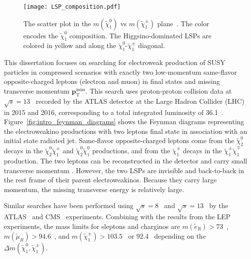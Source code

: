 \begin{figure}[htbp]
    \begin{center}
        \texttt{[image: LSP\_composition.pdf]}
        \caption{The scatter plot in the $m(\widetilde{\chi}^{0}_{1})$ vs $m(\widetilde{\chi}^{\pm}_{1})$ plane~\cite{Aaboud:2016wna}.
        The color encodes the $\widetilde{\chi}^{0}_{1}$ composition.
        The Higgsino-dominated LSPs are colored in yellow and along the $\widetilde{\chi}^{0}_{1}$-$\widetilde{\chi}^{\pm}_{1}$ diagonal.}
        \label{fig:intro_LSP_composition}
    \end{center}
\end{figure}

This dissertation focuses on searching for electroweak production of SUSY particles in compressed scenarios with exactly two low-momentum same-flavor opposite-charged leptons (electron and muon) in final states and missing transverse momentum $\textbf{p}_{\text{T}}^{\text{miss}}$.
This search uses proton-proton collision data at $\sqrt{s} = 13$~{\TeV} recorded by the ATLAS detector at the Large Hadron Collider (LHC)~\cite{Evans:2008zzb} in 2015 and 2016, corresponding to a total integrated luminosity of 36.1~\ifb.
Figure~\ref{fig:intro_feynman_diagrams} shows the Feynman diagrams representing the electroweakino productions with two leptons final state in association with an initial state radiated jet.
Same-flavor opposite-charged leptons come from the $\widetilde{\chi}^{0}_{2}$ decays in the $\widetilde{\chi}^{0}_{2} \widetilde{\chi}^{\pm}_{1}$ and $\widetilde{\chi}^{0}_{2} \widetilde{\chi}^{0}_{1}$ productions, and from the $\widetilde{\chi}^{\pm}_{1}$ decays in the $\widetilde{\chi}^{\pm}_{1} \widetilde{\chi}^{\mp}_{1}$ production.
The two leptons can be reconstructed in the detector and carry small transverse momentum  \pt.
However, the two LSPs are invisible and back-to-back in the rest frame of their parent electroweakinos.
Because they carry large momentum, the missing transverse energy \met is relatively large.

Similar searches have been performed using $\sqrt{s} = 8$~{\TeV} and $\sqrt{s} = 13$~{\TeV} by the ATLAS~\cite{Aad:2014vma, Aad:2014nua, Aad:2015eda, Aaboud:2016wna} and CMS~\cite{Khachatryan:2014qwa, Khachatryan:2015pot, Sirunyan:2017lae} experiments.
Combining with the results from the LEP experiments, the mass limits for sleptons and charginos are $m(\widetilde{e}_{R}) > 73$~{\GeV}, $m(\widetilde{\mu}_{R}) > 94.6$~{\GeV}, and $m(\widetilde{\chi}^{\pm}_{1}) > 103.5$~{\GeV} or 92.4~{\GeV} depending on the $\Delta m(\widetilde{\chi}^{0}_{1}, \widetilde{\chi}^{\pm}_{1})$.

